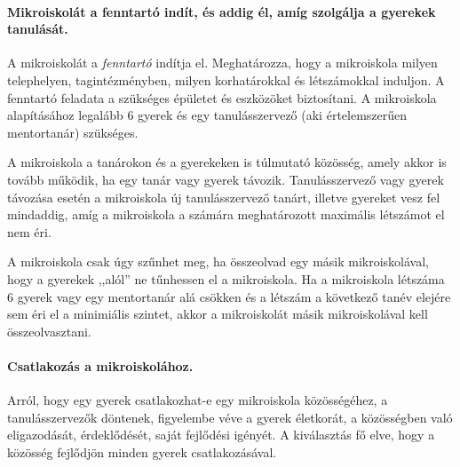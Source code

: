 \paragraph{Mikroiskolát a fenntartó indít, és addig él, amíg szolgálja a gyerekek tanulását.}
A mikroiskolát a \emph{fenntartó} indítja el. Meghatározza, hogy a mikroiskola milyen telephelyen, tagintézményben, milyen korhatárokkal és létszámokkal induljon. A fenntartó feladata a szükséges épületet és eszközöket biztosítani. A mikroiskola alapításához legalább 6 gyerek és egy tanulásszervező (aki értelemszerűen mentortanár) szükséges.

A mikroiskola a tanárokon és a gyerekeken is túlmutató
közösség,
amely akkor is tovább működik, ha egy tanár vagy gyerek távozik. Tanulásszervező vagy gyerek távozása esetén a mikroiskola  új tanulásszervező tanárt, illetve gyereket vesz fel mindaddig, amíg a mikroiskola a számára meghatározott maximális létszámot el nem éri.

A mikroiskola csak úgy szűnhet meg, ha összeolvad egy másik mikroiskolával, hogy a gyerekek ,,alól'' ne tűnhessen el a mikroiskola. Ha a mikroiskola létszáma 6 gyerek vagy egy mentortanár alá csökken és a létszám a következő tanév elejére sem éri el a minimiális szintet, akkor a mikroiskolát másik mikroiskolával kell összeolvasztani.

\paragraph{Csatlakozás a mikroiskolához.}
Arról, hogy egy gyerek csat\-la\-kozhat-e
egy mikroiskola közösségéhez, a tanulásszervezők döntenek, figyelembe véve a gyerek életkorát, a közösségben való eligazodását, érdeklődését, saját fejlődési igényét. A kiválasztás fő elve,  hogy a közösség fejlődjön minden gyerek csatlakozásával.
